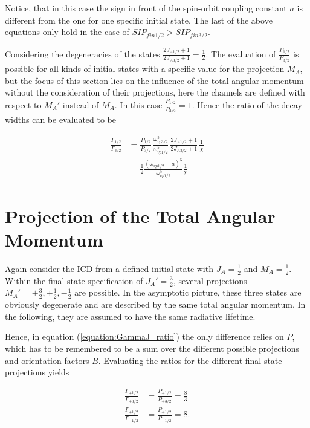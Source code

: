 Notice, that in this case the sign in front of the spin-orbit coupling
constant $a$ is different from the one for one specific initial state.
The last of the above equations only hold in the case of
$SIP_{fin1/2} > SIP_{fin3/2}$.

Considering the degeneracies of the states
$\frac{2J_{A1/2}+1}{2J_{A3/2}+1} = \frac 12$.
The evaluation of $\frac{P_{1/2}}{P_{3/2}}$ is possible for all kinds
of initial states with a specific value for the projection $M_A$, but
the focus of this section lies on the influence of the total
angular momentum without the consideration of their projections, here
the channels are defined with respect to $M_A'$ instead of
$M_A$. In this case $\frac{P_{1/2}}{P_{3/2}} = 1$.
Hence the ratio of the decay widths can be evaluated to be

\begin{align}
  \frac{\Gamma_{1/2}}{\Gamma_{3/2}}
  &= \frac{P_{1/2}}{P_{3/2}}
     \,\frac{\omega_{vp3/2}^5}{\omega_{vp1/2}^5}
     \,\frac{2J_{A1/2}+1}{2J_{A3/2}+1} \, \frac{1}{\chi}\\
  &= \frac 12 \frac{(\omega_{vp1/2} -a)^5}{\omega_{vp1/2}^5} \frac{1}{\chi}
\end{align}


\section{Projection of the Total Angular Momentum}
Again consider the ICD from a defined initial state with $J_A=\frac 12$ and
$M_A=\frac 12$. Within the final state specification of $J_A'=\frac 32$, several
projections $M_A'= +\frac 32, +\frac 12, -\frac 12$ are possible. In the asymptotic
picture, these three states are obviously degenerate and are described by the same
total angular momentum. In the following, they are assumed to have the
same radiative lifetime.

Hence, in equation (\ref{equation:GammaJ_ratio}) the only difference relies on $P$,
which has to be remembered to be a sum over the different possible projections
and orientation factors $B$. Evaluating the ratios for the different final state
projections yields

\begin{align}
  \frac{\Gamma_{+1/2}}{\Gamma_{+3/2}} &= \frac{P_{+1/2}}{P_{+3/2}} = \frac 83  \\
  \frac{\Gamma_{+1/2}}{\Gamma_{-1/2}} &= \frac{P_{+1/2}}{P_{-1/2}} = 8   .
\end{align}

